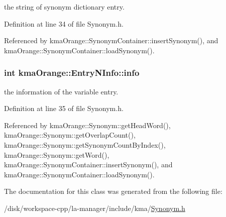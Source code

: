 the string of synonym dictionary entry. 



Definition at line 34 of file Synonym.h.

Referenced by kmaOrange::SynonymContainer::insertSynonym(), and kmaOrange::SynonymContainer::loadSynonym().\hypertarget{classkmaOrange_1_1EntryNInfo_89c4318b80caf33b7d7acda2ad3bd01e}{
\subsubsection[{info}]{\setlength{\rightskip}{0pt plus 5cm}int {\bf kmaOrange::EntryNInfo::info}}}
\label{classkmaOrange_1_1EntryNInfo_89c4318b80caf33b7d7acda2ad3bd01e}


the information of the variable entry. 



Definition at line 35 of file Synonym.h.

Referenced by kmaOrange::Synonym::getHeadWord(), kmaOrange::Synonym::getOverlapCount(), kmaOrange::Synonym::getSynonymCountByIndex(), kmaOrange::Synonym::getWord(), kmaOrange::SynonymContainer::insertSynonym(), and kmaOrange::SynonymContainer::loadSynonym().

The documentation for this class was generated from the following file:\begin{CompactItemize}
\item 
/disk/workspace-cpp/la-manager/include/kma/\hyperlink{Synonym_8h}{Synonym.h}\end{CompactItemize}

